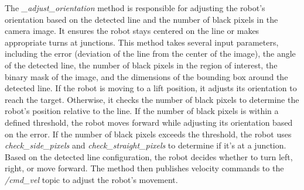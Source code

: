 \documentclass[a4paper,12pt]{extreport}
\begin{document}
The \emph{\_adjust\_orientation} method is responsible for adjusting the
robot's orientation based on the detected line and the number of black
pixels in the camera image. It ensures the robot stays centered on the
line or makes appropriate turns at junctions. This method takes several
input parameters, including the error (deviation of the line from the
center of the image), the angle of the detected line, the number of
black pixels in the region of interest, the binary mask of the image,
and the dimensions of the bounding box around the detected line. If the
robot is moving to a lift position, it adjusts its orientation to reach
the target. Otherwise, it checks the number of black pixels to determine
the robot's position relative to the line. If the number of black pixels
is within a defined threshold, the robot moves forward while adjusting
its orientation based on the error. If the number of black pixels
exceeds the threshold, the robot uses \emph{check\_side\_pixels} and
\emph{check\_straight\_pixels} to determine if it's at a junction. Based
on the detected line configuration, the robot decides whether to turn
left, right, or move forward. The method then publishes velocity
commands to the \emph{/cmd\_vel} topic to adjust the robot's movement.
\end{document}
